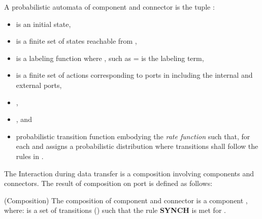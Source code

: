 \begin{mydef} \label{def:pacc} \normalfont
A probabilistic automata of component  and connector  is the tuple :
\label{ts}
\begin{itemize}
	\item {} is an initial state,
 
	\item {} is a finite set of states reachable from ,
	\item {} is a labeling function where , such as = is the  labeling term, 
	\item \emath{\Sigma}  is a finite set of actions corresponding to ports in   including the internal and external ports, 

    \item {},
 
    \item {}, and  
 
    \item {} probabilistic transition function embodying the \emph{rate function} such that, for each  and  assigns a probabilistic distribution  where transitions shall follow the rules in .
    

\end{itemize}
\end{mydef}


The Interaction during data transfer is a composition involving components and connectors. The result of composition on port  is defined as follows:

\begin{mydef} \label{def:composition} \normalfont (Composition) The composition of component  and connector  is a component , where:  is a set of transitions ()  such that the rule \textbf{SYNCH} is met for .
\end{mydef}



